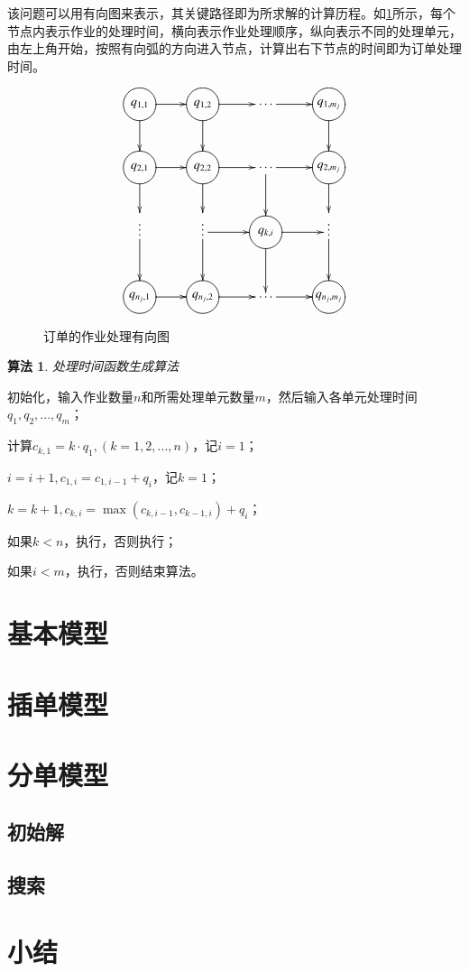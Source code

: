 该问题可以用有向图来表示，其关键路径即为所求解的计算历程。如\ref{fig:directedgraph}所示，每个节点内表示作业的处理时间，横向表示作业处理顺序，纵向表示不同的处理单元，由左上角开始，按照有向弧的方向进入节点，计算出右下节点的时间即为订单处理时间。
\begin{figure}[h]
\newcommand{\process}[1]{*++=[o][F]{\makebox[2em]{$#1$}}}
\begin{equation*}
\xymatrix{
\process{q_{1,1}} \ar[r] \ar[d] & \process{q_{1,2}} \ar[d] \ar[r] & \cdots\ar[r] & \process{q_{1,m_j}} \ar[d]\\
\process{q_{2,1}} \ar[r]\ar[d] & \process{q_{2,2}} \ar[d]\ar[r] & \cdots \ar[r] \ar[d]& \process{q_{2,m_j}} \ar[d] \\
\vdots\ar[d] & \vdots \ar[d]\ar[r] & \process{q_{k,i}}\ar[r]\ar[d] &\vdots \ar[d]\\
\process{q_{n_j,1}} \ar[r] & \process{q_{n_j,2}} \ar[r] & \cdots\ar[r] & \process{q_{n_j,m_j}} 
}
\end{equation*}
\caption{订单的作业处理有向图\label{fig:directedgraph}}
\end{figure}

\theoremheaderfont{\heiti}
\newtheorem{algori}[algor]{算法}%
\begin{algori}
处理时间函数生成算法
\end{algori}
\begin{asparaenum}
\renewcommand{\labelenumi}{\bf Step\theenumi~}
\item 初始化，输入作业数量$n$和所需处理单元数量$m$，然后输入各单元处理时间$q_1,q_2,...,q_m$；
\item 计算$c_{k,1} = k\cdot q_1,(k = 1,2,...,n)$，记$i = 1$；
\item $i = i + 1, c_{1,i} = c_{1,i-1} + q_i$，记$k = 1$；
\item $k = k + 1, c_{k,i} = \max(c_{k,i-1}, c_{k-1,i}) + q_i$；
\item 如果$k<n$，执行，否则执行；
\item 如果$i<m$，执行，否则结束算法。
\end{asparaenum}

\section{基本模型}

\section{插单模型}

\section{分单模型}

\subsection{初始解}

\subsection{搜索}


\section{小结}